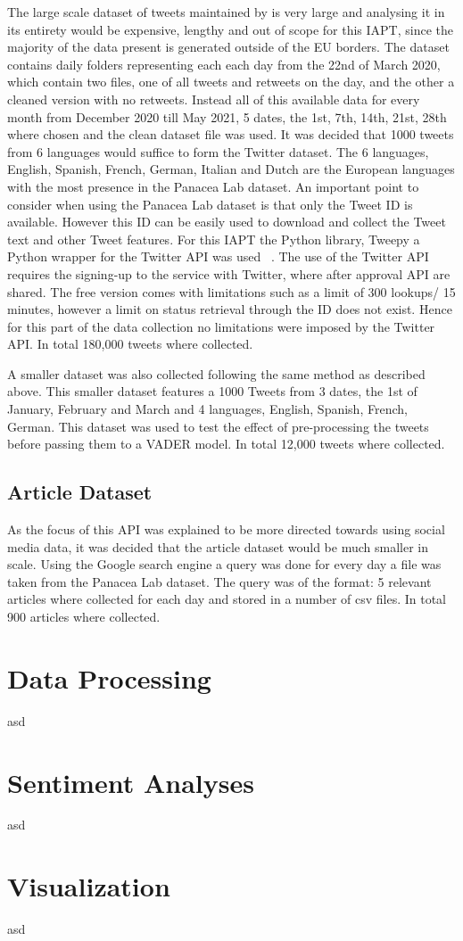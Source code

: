 The large scale dataset of tweets maintained by \citet{banda2020largescale} is very large and analysing it in its entirety would be expensive, lengthy and out of scope for this \ac{IAPT}, since the majority of the data present is generated outside of the \ac{EU} borders.
The dataset contains daily folders representing each each day from the 22nd of March 2020, which contain two files, one of all tweets and retweets on the day, and the other a cleaned version with no retweets.
Instead all of this available data for every month from December 2020 till May 2021, 5 dates, the 1st, 7th, 14th, 21st, 28th where chosen and the clean dataset file was used.
It was decided that 1000 tweets from 6 languages would suffice to form the Twitter dataset.
The 6 languages, English, Spanish, French, German, Italian and Dutch are the European languages with the most presence in the Panacea Lab dataset.
An important point to consider when using the Panacea Lab dataset is that only the Tweet ID is available.
However this ID can be easily used to download and collect the Tweet text and other Tweet features.
For this \ac{IAPT} the Python library, Tweepy a Python wrapper for the Twitter \ac{API} was used ~\citep{roesslein2020tweepy}.
The use of the Twitter \ac{API} requires the signing-up to the service with Twitter, where after approval \ac{API} are shared.
The free version comes with limitations such as a limit of 300 lookups/ 15 minutes, however a limit on status retrieval through the ID does not exist.
Hence for this part of the data collection no limitations were imposed by the Twitter \ac{API}.
In total 180,000 tweets where collected.

A smaller dataset was also collected following the same method as described above.
This smaller dataset features a 1000 Tweets from 3 dates, the 1st of January, February and March and 4 languages, English, Spanish, French, German.
This dataset was used to test the effect of pre-processing the tweets before passing them to a \ac{VADER} model.
In total 12,000 tweets where collected.

\subsection{Article Dataset}

As the focus of this \ac{API} was explained to be more directed towards using social media data, it was decided that the article dataset would be much smaller in scale.
Using the Google search engine a query was done for every day a file was taken from the Panacea Lab dataset.
The query was of the format: 
5 relevant articles where collected for each day and stored in a number of csv files.
In total 900 articles where collected.

\section{Data Processing}
asd

\section{Sentiment Analyses}
asd

\section{Visualization}
asd